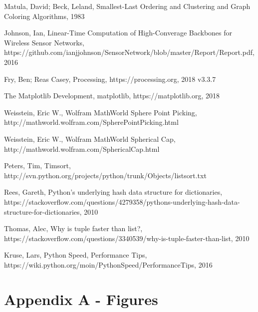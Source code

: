 \documentclass{article}
\begin{document}
\newpage

\begin{thebibliography}{10}
    Matula, David; Beck, Leland, Smallest-Last Ordering and Clustering and Graph Coloring Algorithms, 1983

    Johnson, Ian, Linear-Time Computation of High-Converage Backbones for Wireless Sensor Networks, https://github.com/ianjjohnson/SensorNetwork/blob/master/Report/Report.pdf, 2016

    Fry, Ben; Reas Casey, Processing, https://processing.org, 2018 v3.3.7

    The Matplotlib Development, matplotlib, https://matplotlib.org, 2018

    Weisstein, Eric W., Wolfram MathWorld Sphere Point Picking, http://mathworld.wolfram.com/SpherePointPicking.html

    Weisstein, Eric W., Wolfram MathWorld Spherical Cap, http://mathworld.wolfram.com/SphericalCap.html

    Peters, Tim, Timsort, http://svn.python.org/projects/python/trunk/Objects/listsort.txt

    Rees, Gareth, Python's underlying hash data structure for dictionaries, https://stackoverflow.com/questions/4279358/pythons-underlying-hash-data-structure-for-dictionaries, 2010

    Thomas, Alec, Why is tuple faster than list?, https://stackoverflow.com/questions/3340539/why-is-tuple-faster-than-list, 2010

    Kruse, Lars, Python Speed, Performance Tips, https://wiki.python.org/moin/PythonSpeed/PerformanceTips, 2016

\end{thebibliography}

\newpage

\section{Appendix A - Figures}
\end{document}
